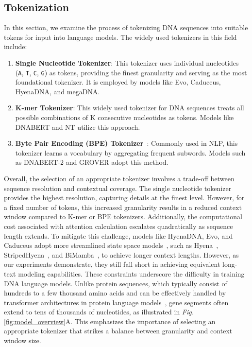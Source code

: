 \subsection{Tokenization}
\label{sec:tokenization}
In this section, we examine the process of tokenizing DNA sequences into suitable tokens for input into language models. The widely used tokenizers in this field include:
\begin{enumerate}
    \item \textbf{Single Nucleotide Tokenizer}: This tokenizer uses individual nucleotides (\texttt{A}, \texttt{T}, \texttt{C}, \texttt{G}) as tokens, providing the finest granularity and serving as the most foundational tokenizer. It is employed by models like Evo, Caduceus, HyenaDNA, and megaDNA.
    \item \textbf{K-mer Tokenizer}: This widely used tokenizer for DNA sequences treats all possible combinations of K consecutive nucleotides as tokens. Models like DNABERT and NT utilize this approach.
    \item \textbf{Byte Pair Encoding (BPE) Tokenizer}~\cite{SentencePiece}: Commonly used in NLP, this tokenizer learns a vocabulary by aggregating frequent subwords. Models such as DNABERT-2 and GROVER adopt this method.
\end{enumerate}
Overall, the selection of an appropriate tokenizer involves a trade-off between sequence resolution and contextual coverage. The single nucleotide tokenizer provides the highest resolution, capturing details at the finest level. However, for a fixed number of tokens, this increased granularity results in a reduced context window compared to K-mer or BPE tokenizers. Additionally, the computational cost associated with attention calculation escalates quadratically as sequence length extends. To mitigate this challenge, models like HyenaDNA, Evo, and Caduceus adopt more streamlined state space models~\cite{ssm}, such as Hyena~\cite{Hyena}, StripedHyena~\cite{StripedHyena}, and BiMamba~\cite{Caduceus}, to achieve longer context lengths. However, as our experiments demonstrate, they still fall short in achieving equivalent long-text modeling capabilities. These constraints underscore the difficulty in training DNA language models. Unlike protein sequences, which typically consist of hundreds to a few thousand amino acids and can be effectively handled by transformer architectures in protein language models~\cite{esm2}, gene segments often extend to tens of thousands of nucleotides, as illustrated in \textit{Fig.} \ref{fig:model_overview}A. This emphasizes the importance of selecting an appropriate tokenizer that strikes a balance between granularity and context window size.


